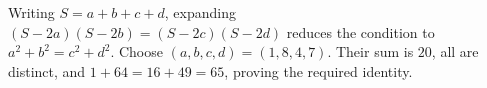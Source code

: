 Writing $S=a+b+c+d$, expanding $(S-2a)(S-2b)=(S-2c)(S-2d)$ reduces the condition to $a^2+b^2=c^2+d^2$. Choose $(a,b,c,d)=(1,8,4,7)$. Their sum is $20$, all are distinct, and $1+64=16+49=65$, proving the required identity.

